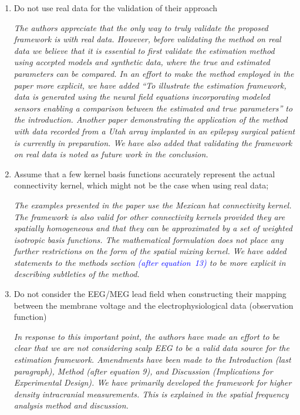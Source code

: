 \documentclass{article}
\newcommand{\parham}[1]{\textcolor{blue}{#1}}
\begin{document}
    \begin{enumerate}
        \item Do not use real data for the validation of their approach

	\emph{The authors appreciate that the only way to truly validate the proposed framework is with real data. However, before validating the method on real data we believe that it is essential to first validate the estimation method using accepted models and synthetic data, where the true and estimated parameters can be compared. In an effort to make the method employed in the paper more explicit, we have added ``To illustrate the estimation framework, data is generated using the neural field equations incorporating modeled sensors enabling a comparison between the estimated and true parameters'' to the introduction. Another paper demonstrating the application of the method with data recorded from a Utah array implanted in an epilepsy surgical patient is currently in preparation. We have also added that validating the framework on real data is noted as future work in the conclusion.}
	
        \item Assume that a few kernel basis functions accurately represent the actual connectivity kernel, which might not be the case when using real data;

	\emph{The examples presented in the paper use the Mexican hat connectivity kernel. The framework is also valid for other connectivity kernels provided they are spatially homogeneous and that they can be approximated by a set of weighted isotropic basis functions. The mathematical formulation does not place any further restrictions on the form of the spatial mixing kernel. We have added statements to the methods section \parham{(after equation~13)} to be more explicit in describing subtleties of the method.}

        \item Do not consider the EEG/MEG lead field when constructing their mapping between the membrane voltage and the electrophysiological data (observation function)

	\emph{In response to this important point, the authors have made an effort to be clear that we are not considering scalp EEG to be a valid data source for the estimation framework. Amendments have been made to the Introduction (last paragraph), Method (after equation 9), and Discussion (Implications for Experimental Design). We have primarily developed the framework for higher density intracranial measurements. This is explained in the spatial frequency analysis method and discussion.}
	
    \end{enumerate}
    
\end{document}

